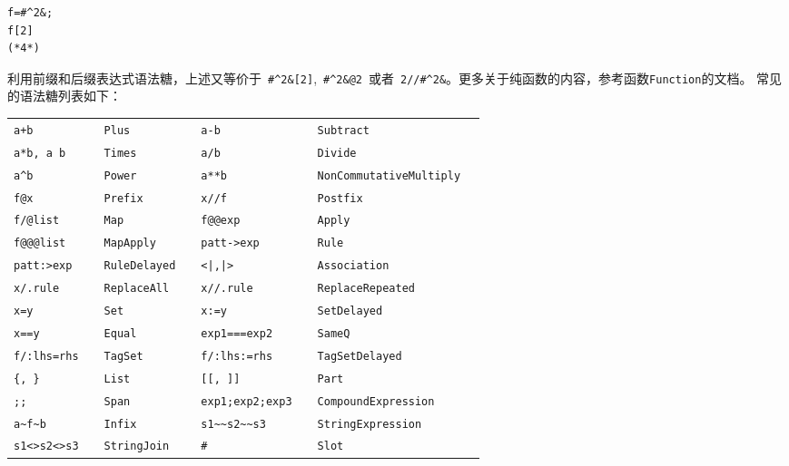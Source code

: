 \documentclass[UTF8,a4paper,10pt]{ctexart}
\begin{document}
\begin{lstlisting}
f=#^2&;
f[2]
(*4*)
\end{lstlisting}
\noindent
利用前缀和后缀表达式语法糖，上述又等价于~\verb|#^2&[2]|,~\verb|#^2&@2|~或者~\verb|2//#^2&|。更多关于纯函数的内容，参考函数\verb|Function|的文档。
常见的语法糖列表如下：
\noindent
\begin{center}
\begin{tabular}{llll|llll}
\hline\hline\hline
\;\verb|a+b|  & & {\;}\verb|Plus| & \qquad  &
\;\verb|a-b| & & {\;}\verb|Subtract| & \qquad \\
\;\verb|a*b, a b|  & & {\;}\verb|Times| & \qquad  &
\;\verb|a/b| & & {\;}\verb|Divide| & \qquad \\
\;\verb|a^b|  & & {\;}\verb|Power| & \qquad  &
\;\verb|a**b| & & {\;}\verb|NonCommutativeMultiply| & \qquad \\
\;\verb|f@x|  & & {\;}\verb|Prefix| & \qquad  &
\;\verb|x//f| & & {\;}\verb|Postfix| & \qquad \\
\;\verb|f/@list|  & & {\;}\verb|Map| & \qquad  &
\;\verb|f@@exp|  & & {\;}\verb|Apply| & \qquad  \\
\;\verb|f@@@list| & & {\;}\verb|MapApply| & \qquad &
\;\verb|patt->exp| & & {\;}\verb|Rule| & \qquad \\
\;\verb|patt:>exp| & & {\;}\verb|RuleDelayed| & \qquad &
\;\verb+<|,|>+ & & {\;}\verb|Association| & \qquad \\
\;\verb|x/.rule|  & & {\;}\verb|ReplaceAll| & \qquad  &
\;\verb|x//.rule| & & {\;}\verb|ReplaceRepeated| & \qquad \\
\;\verb|x=y|  & & {\;}\verb|Set| & \qquad  &
\;\verb|x:=y| & & {\;}\verb|SetDelayed| & \qquad \\
\;\verb|x==y|  & & {\;}\verb|Equal| & \qquad  &
\;\verb|exp1===exp2| & & {\;}\verb|SameQ| & \qquad \\
\;\verb|f/:lhs=rhs|  & & {\;}\verb|TagSet| & \qquad  &
\;\verb|f/:lhs:=rhs|  & & {\;}\verb|TagSetDelayed| & \qquad  \\
\;\verb|{, }| & & {\;}\verb|List| & \qquad &
\;\verb|[[, ]]|  & & {\;}\verb|Part| & \qquad  \\
\;\verb|;;| & & {\;}\verb|Span| & \qquad &
\;\verb|exp1;exp2;exp3|  & & {\;}\verb|CompoundExpression| & \qquad  \\
\;\verb|a~f~b|  & & {\;}\verb|Infix| & \qquad  &
\;\verb|s1~~s2~~s3| & & {\;}\verb|StringExpression| & \qquad \\
\;\verb|s1<>s2<>s3|  & & {\;}\verb|StringJoin| & \qquad  &
\;\verb|#| & & {\;}\verb|Slot| & \qquad \\

\end{tabular}
\end{center}
\end{document}
